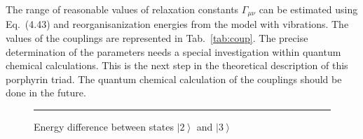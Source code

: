 \documentclass[12pt,twoside,a4paper]{report}
\begin{document}
The range of reasonable values of relaxation constants
$\Gamma_{\mu \nu}$
can be estimated
using
Eq.~(4.43) and reorganisanization energies from the model with vibrations.
The  values of the couplings are 
represented 
in Tab.~\ref{tab:coup}.  
The precise determination
of the parameters
needs
a special investigation
within quantum chemical calculations.
This is the  next step in the theoretical description of this porphyrin triad.
The  quantum chemical calculation of the couplings should be done in the future.




%
%
\begin{footnotesize}\begin{figure}[!h] 
\begin{center} 
\parbox{5cm}{
\rule{-3cm}{0cm}\epsfxsize=9cm 
}
\end{center}
\caption[Energy difference between states 
$\left|2\right>$
and 
$\left| 3 \right> $]
{\small 
\label{dE-fig}
Energy difference between states 
$\left|2\right>$
and 
$\left| 3 \right> $}
\end{figure}\end{footnotesize} 
%
%
\end{document}
